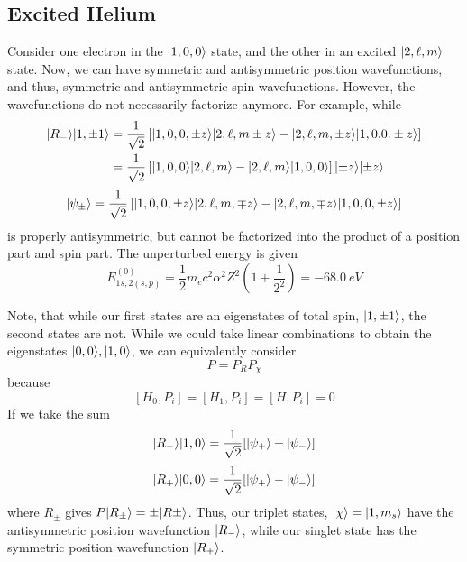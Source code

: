\subsection{Excited Helium}
Consider one electron in the \(\lvert1,0,0\rangle\) state, and the other in an excited \(\lvert2,\ell,m\rangle\) state.
Now, we can have symmetric and antisymmetric position wavefunctions, and thus, symmetric and antisymmetric spin wavefunctions. However, the wavefunctions do not necessarily factorize anymore. For example, while
\begin{align*}
	\lvert R_-\rangle\lvert1,\pm1\rangle&=\frac{1}{\sqrt{2}}\left[\lvert1,0,0,\pm z\rangle\lvert2,\ell,m\pm z\rangle - \lvert2,\ell,m,\pm z\rangle\lvert1,0.0.\pm z\rangle\right]\\
	    &=\frac{1}{\sqrt{2}}\left[\lvert1,0,0\rangle\lvert2,\ell,m\rangle - \lvert2,\ell,m\rangle\lvert1,0,0\rangle\right]\lvert\pm z\rangle\lvert\pm z\rangle
\end{align*}
\[\lvert\psi_\pm\rangle= \frac{1}{\sqrt{2}} \left[\lvert1,0,0,\pm z\rangle\lvert2,\ell,m,\mp z\rangle-\lvert2,\ell, m, \mp z\rangle\lvert1,0,0,\pm z\rangle\right]\]
is properly antisymmetric, but cannot be factorized into the product of a position part and spin part.
The unperturbed energy is given
\[E_{1s,2(s,p)}^{(0)} = \frac{1}{2}m_e c^2 \alpha^2 Z^2 \left(1+\frac{1}{2^2}\right) = -\SI{68.0}{eV}\]

Note, that while our first states are an eigenstates of total spin, \(\lvert1,\pm 1\rangle\), the second states are not. While we could take linear combinations to obtain the eigenstates \(\lvert0,0\rangle,\lvert1,0\rangle\), we can equivalently consider
\[P = P_RP_\chi\]
because
\[[H_0,P_i] = [H_1, P_i] = [H,P_i]=0\]
If we take the sum 
\[\lvert R_-\rangle\lvert1,0\rangle = \frac{1}{\sqrt{2}}[\lvert\psi_+\rangle+\lvert\psi_-\rangle]\]
\[\lvert R_+\rangle\lvert0,0\rangle = \frac{1}{\sqrt{2}}[\lvert\psi_+\rangle-\lvert\psi_-\rangle]\]
where \(R_\pm\) gives \(P\lvert R_\pm\rangle = \pm\lvert R\pm\rangle\). Thus, our triplet states, \(\lvert\chi\rangle=\lvert1,m_s\rangle\) have the antisymmetric position wavefunction \(\lvert R_-\rangle\), while our singlet state has the symmetric position wavefunction \(\lvert R_+\rangle\).

